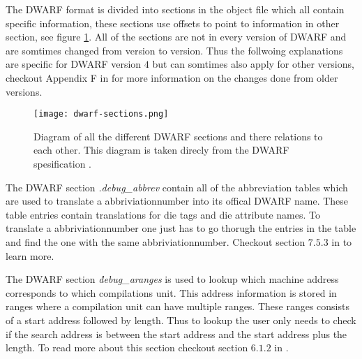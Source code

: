  


The \gls{DWARF} format is divided into sections in the object file which all contain specific information, these sections use offsets to point to information in other section, see figure \ref{fig:dwarfsections}.
All of the sections are not in every version of \gls{DWARF} and are somtimes changed from version to version.
Thus the follwoing explanations are specific for \gls{DWARF} version $4$ but can somtimes also apply for other versions, checkout Appendix F in \cite{dwarf} for more information on the changes done from older versions.


\begin{figure}[h]
	\centering
	\texttt{[image: dwarf-sections.png]}
	\caption{Diagram of all the different \gls{DWARF} sections and there relations to each other. This diagram is taken direcly from the \gls{DWARF} spesification \cite{dwarf}.}
	\label{fig:dwarfsections}
\end{figure}


The \gls{DWARF} section \emph{.debug\_abbrev} contain all of the abbreviation tables which are used to translate a abbriviationnumber into its offical \gls{DWARF} name.
These table entries contain translations for \gls{die} tags and \gls{die} attribute names.
To translate a abbriviationnumber one just has to go thorugh the entries in the table and find the one with the same abbriviationnumber.
Checkout section $7.5.3$ in \cite{dwarf} to learn more.


The \gls{DWARF} section \emph{\.debug\_aranges} is used to lookup which machine address corresponds to which compilations unit.
This address information is stored in ranges where a compilation unit can have multiple ranges.
These ranges consists of a start address followed by length.
Thus to lookup the user only needs to check if the search address is between the start address and the start address plus the length.
To read more about this section checkout section $6.1.2$ in \cite{dwarf}.


